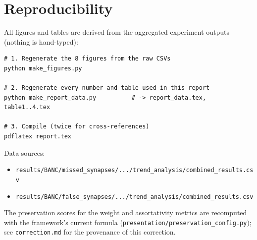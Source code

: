 \documentclass[11pt,a4paper]{article}
\begin{document}
\section*{Reproducibility}
All figures and tables are derived from the aggregated experiment outputs
(nothing is hand-typed):

\begin{lstlisting}
# 1. Regenerate the 8 figures from the raw CSVs
python make_figures.py

# 2. Regenerate every number and table used in this report
python make_report_data.py          # -> report_data.tex, table1..4.tex

# 3. Compile (twice for cross-references)
pdflatex report.tex
\end{lstlisting}

Data sources:
\begin{itemize}
  \item \texttt{results/BANC/missed\_synapses/.../trend\_analysis/combined\_results.csv}
  \item \texttt{results/BANC/false\_synapses/.../trend\_analysis/combined\_results.csv}
\end{itemize}

The preservation scores for the weight and assortativity metrics are
recomputed with the framework's current formula
(\texttt{presentation/preservation\_config.py}); see
\texttt{correction.md} for the provenance of this correction.
\end{document}
